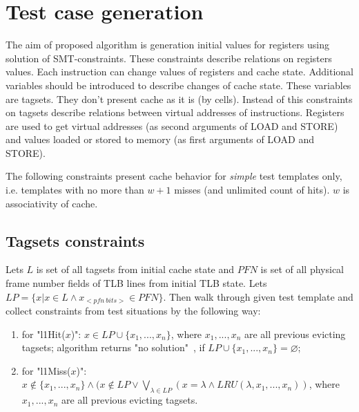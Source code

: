 \documentclass[times, 10pt,twocolumn]{article}
\begin{document}
\section{Test case generation}

The aim of proposed algorithm is generation initial values for registers using solution of SMT-constraints. These constraints describe relations on registers values. Each instruction can change values of registers and cache state. Additional variables should be introduced to describe changes of cache state. These variables are tagsets. They don't present cache as it is (by cells). Instead of this constraints on tagsets describe relations between virtual addresses of instructions. Registers are used to get virtual addresses (as second arguments of LOAD and STORE) and values loaded or stored to memory (as first arguments of LOAD and STORE).

The following constraints present cache behavior for \emph{simple} test templates only, i.e. templates with no more than $w+1$ misses (and unlimited count of hits). $w$ is associativity of cache.

\subsection{Tagsets constraints}
Lets $L$ is set of all tagsets from initial cache state and $PFN$ is
set of all physical frame number fields of TLB lines from initial
TLB state. Lets $LP = \{ x | x \in L \wedge x_{<pfn~bits>} \in
PFN\}$. Then walk through given test template and collect
constraints from test situations by the following way:
\begin{enumerate} \item for "l1Hit($x$)": $x \in LP \cup \{ x_1,
..., x_n \}$, where $x_1, ..., x_n$ are all previous evicting
tagsets; algorithm returns "no solution"\ , if $LP \cup \{ x_1, ...,
x_n \} = \varnothing$; \item for "l1Miss($x$)": $x \notin \{x_1,
..., x_n \} \wedge (x \notin LP \vee \bigvee_{\lambda \in LP} (x =
\lambda \wedge LRU(\lambda, x_1, ..., x_n))$, where $x_1, ..., x_n$
are all previous evicting tagsets. \end{enumerate}
\end{document}
